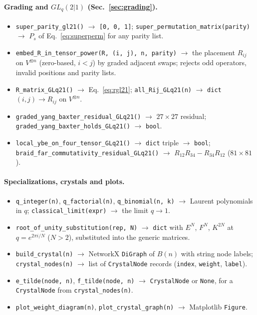 \documentclass{SciPost}
\newcommand{\GL}{GL_q(2|1)}
\begin{document}
\begin{appendix}
\paragraph{Grading and \texorpdfstring{$\GL$}{GLq(2|1)} (Sec.~\ref{sec:grading}).}
\begin{itemize}\setlength{\itemsep}{1pt}\setlength{\parskip}{0pt}
\item \texttt{super\_parity\_gl21()} $\to$ \texttt{[0, 0, 1]}; \texttt{super\_permutation\_matrix(parity)} $\to$ $P_s$ of Eq.~\eqref{eq:superperm} for any parity list.
\item \texttt{embed\_R\_in\_tensor\_power(R, (i, j), n, parity)} $\to$ the placement $R_{ij}$ on $V^{\otimes n}$ (zero-based, $i<j$) by graded adjacent swaps; rejects odd operators, invalid positions and parity lists.
\item \texttt{R\_matrix\_GLq21()} $\to$ Eq.~\eqref{eq:rgl21}; \texttt{all\_Rij\_GLq21(n)} $\to$ \texttt{dict} $(i,j)\to R_{ij}$ on $V^{\otimes n}$.
\item \texttt{graded\_yang\_baxter\_residual\_GLq21()} $\to$ $27\times27$ residual; \texttt{graded\_yang\_baxter\_holds\_GLq21()} $\to$ \texttt{bool}.
\item \texttt{local\_ybe\_on\_four\_tensor\_GLq21()} $\to$ \texttt{dict} triple $\to$ \texttt{bool}; \texttt{braid\_far\_commutativity\_residual\_GLq21()} $\to$ $R_{12}R_{34}-R_{34}R_{12}$ ($81\times81$).
\end{itemize}

\paragraph{Specializations, crystals and plots.}
\begin{itemize}\setlength{\itemsep}{1pt}\setlength{\parskip}{0pt}
\item \texttt{q\_integer(n)}, \texttt{q\_factorial(n)}, \texttt{q\_binomial(n, k)} $\to$ Laurent polynomials in $q$; \texttt{classical\_limit(expr)} $\to$ the limit $q\to1$.
\item \texttt{root\_of\_unity\_substitution(rep, N)} $\to$ \texttt{dict} with $E^N$, $F^N$, $K^{2N}$ at $q=e^{2\pi i/N}$ ($N>2$), substituted into the generic matrices.
\item \texttt{build\_crystal(n)} $\to$ NetworkX \texttt{DiGraph} of $B(n)$ with string node labels; \texttt{crystal\_nodes(n)} $\to$ list of \texttt{CrystalNode} records (\texttt{index}, \texttt{weight}, \texttt{label}).
\item \texttt{e\_tilde(node, n)}, \texttt{f\_tilde(node, n)} $\to$ \texttt{CrystalNode} or \texttt{None}, for a \texttt{CrystalNode} from \texttt{crystal\_nodes(n)}.
\item \texttt{plot\_weight\_diagram(n)}, \texttt{plot\_crystal\_graph(n)} $\to$ Matplotlib \texttt{Figure}.
\end{itemize}
\par\endgroup

\end{appendix}


\end{document}
